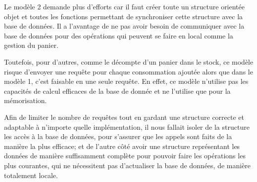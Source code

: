 \documentclass[a4paper,11pt]{article}
\begin{document}
Le modèle 2 demande plus d'efforts car il faut créer toute un structure orientée objet et toutes les fonctions permettant de synchroniser cette structure avec la base de données. Il a l'avantage de ne pas avoir besoin de communiquer avec la base de données pour des opérations qui peuvent se faire en local comme la gestion du panier.

Toutefois, pour d'autres, comme le décompte d'un panier dans le stock, ce modèle risque d'envoyer une requête pour chaque consommation ajoutée alors que dans le modèle 1, c'est faisable en une seule requête. En effet, ce modèle n'utilise pas les capacités de calcul efficaces de la base de donnée et ne l'utilise que pour la mémorisation.

Afin de limiter le nombre de requêtes tout en gardant une structure correcte et adaptable à n'importe quelle implémentation, il nous fallait isoler de la structure les accès à la base de données, pour s'assurer que les appels sont faits de la manière la plus efficace; et de l'autre côté avoir une structure représentant les données de manière suffisamment complète pour pouvoir faire les opérations les plus courantes, qui ne nécessitent pas d'actualiser la base de données, de manière totalement locale.
\end{document}
